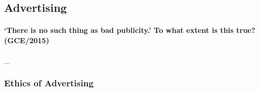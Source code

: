 \documentclass[../../main]{subfiles}
\begin{document}
\subsection{Advertising}

\paragraph{`There is no such thing as bad publicity.' To what extent is this true? (GCE/2015)} \_

\subsubsection{Ethics of Advertising}
\end{document}
